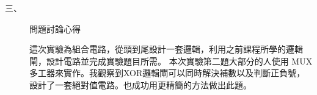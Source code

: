 \documentclass[12pt, a4paper]{article}
\begin{document}
\begin{description}
    \item [三、]問題討論心得 \\[.6cm]
      \begin{minipage}[t]{\linewidth}
        \fontsize{16}{18}\selectfont
          這次實驗為組合電路，從頭到尾設計一套邏輯，利用之前課程所學的邏輯閘，設計電路並完成實驗題目所需。
          本次實驗第二題大部分的人使用 MUX 多工器來實作。我觀察到XOR邏輯閘可以同時解決補數以及判斷正負號，設計了一套絕對值電路。也成功用更精簡的方法做出此題。
        \normalsize  
      \end{minipage}
  \normalsize
\end{description}
\end{document}
